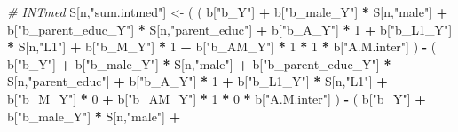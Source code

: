 \documentclass[
]{book}
\newenvironment{Shaded}{\begin{snugshade}}{\end{snugshade}}
\newcommand{\CommentTok}[1]{\textcolor[rgb]{0.56,0.35,0.01}{\textit{#1}}}
\newcommand{\DecValTok}[1]{\textcolor[rgb]{0.00,0.00,0.81}{#1}}
\newcommand{\NormalTok}[1]{#1}
\newcommand{\OtherTok}[1]{\textcolor[rgb]{0.56,0.35,0.01}{#1}}
\newcommand{\SpecialCharTok}[1]{\textcolor[rgb]{0.81,0.36,0.00}{\textbf{#1}}}
\newcommand{\StringTok}[1]{\textcolor[rgb]{0.31,0.60,0.02}{#1}}
\begin{document}
\begin{Shaded}
\begin{Highlighting}[]
    \CommentTok{\# INTmed }
\NormalTok{    S[n,}\StringTok{"sum.intmed"}\NormalTok{] }\OtherTok{\textless{}{-}}\NormalTok{ ( ( b[}\StringTok{"b\_Y"}\NormalTok{] }\SpecialCharTok{+} 
\NormalTok{                               b[}\StringTok{"b\_male\_Y"}\NormalTok{] }\SpecialCharTok{*}\NormalTok{ S[n,}\StringTok{"male"}\NormalTok{] }\SpecialCharTok{+} 
\NormalTok{                               b[}\StringTok{"b\_parent\_educ\_Y"}\NormalTok{] }\SpecialCharTok{*}\NormalTok{ S[n,}\StringTok{"parent\_educ"}\NormalTok{] }\SpecialCharTok{+} 
\NormalTok{                               b[}\StringTok{"b\_A\_Y"}\NormalTok{] }\SpecialCharTok{*} \DecValTok{1} \SpecialCharTok{+} 
\NormalTok{                               b[}\StringTok{"b\_L1\_Y"}\NormalTok{] }\SpecialCharTok{*}\NormalTok{ S[n,}\StringTok{"L1"}\NormalTok{] }\SpecialCharTok{+}
\NormalTok{                               b[}\StringTok{"b\_M\_Y"}\NormalTok{] }\SpecialCharTok{*} \DecValTok{1} \SpecialCharTok{+}
\NormalTok{                               b[}\StringTok{"b\_AM\_Y"}\NormalTok{] }\SpecialCharTok{*} \DecValTok{1} \SpecialCharTok{*} \DecValTok{1} \SpecialCharTok{*}\NormalTok{ b[}\StringTok{"A.M.inter"}\NormalTok{] ) }\SpecialCharTok{{-}} 
\NormalTok{                             ( b[}\StringTok{"b\_Y"}\NormalTok{] }\SpecialCharTok{+} 
\NormalTok{                                 b[}\StringTok{"b\_male\_Y"}\NormalTok{] }\SpecialCharTok{*}\NormalTok{ S[n,}\StringTok{"male"}\NormalTok{] }\SpecialCharTok{+} 
\NormalTok{                                 b[}\StringTok{"b\_parent\_educ\_Y"}\NormalTok{] }\SpecialCharTok{*}\NormalTok{ S[n,}\StringTok{"parent\_educ"}\NormalTok{] }\SpecialCharTok{+} 
\NormalTok{                                 b[}\StringTok{"b\_A\_Y"}\NormalTok{] }\SpecialCharTok{*} \DecValTok{1} \SpecialCharTok{+} 
\NormalTok{                                 b[}\StringTok{"b\_L1\_Y"}\NormalTok{] }\SpecialCharTok{*}\NormalTok{ S[n,}\StringTok{"L1"}\NormalTok{] }\SpecialCharTok{+}
\NormalTok{                                 b[}\StringTok{"b\_M\_Y"}\NormalTok{] }\SpecialCharTok{*} \DecValTok{0} \SpecialCharTok{+}
\NormalTok{                                 b[}\StringTok{"b\_AM\_Y"}\NormalTok{] }\SpecialCharTok{*} \DecValTok{1} \SpecialCharTok{*} \DecValTok{0} \SpecialCharTok{*}\NormalTok{ b[}\StringTok{"A.M.inter"}\NormalTok{] ) }\SpecialCharTok{{-}} 
\NormalTok{                             ( b[}\StringTok{"b\_Y"}\NormalTok{] }\SpecialCharTok{+} 
\NormalTok{                                 b[}\StringTok{"b\_male\_Y"}\NormalTok{] }\SpecialCharTok{*}\NormalTok{ S[n,}\StringTok{"male"}\NormalTok{] }\SpecialCharTok{+} 

\end{Highlighting}
\end{Shaded}
\end{document}
